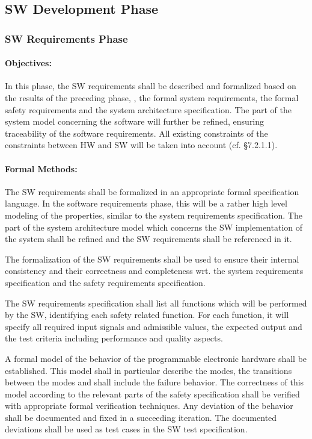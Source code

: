 \subsection{SW Development Phase}
\label{sec:sw-development-phase}

\subsubsection{SW Requirements Phase}
\label{sec:sw-requ-phase}

\paragraph{Objectives:}
\label{sec:sw-req-objective}
In this phase, the SW requirements shall be described and formalized based on
the results of the preceding phase, \ie, the formal system requirements, the
formal safety requirements and the system architecture specification. The part
of the system model concerning the software will further be refined, ensuring
traceability of the software requirements. All existing constraints of the
constraints between HW and SW will be taken into account (cf. §7.2.1.1).

\paragraph{Formal Methods:}
\label{sec:sw-req-formal-methods}
The SW requirements shall be formalized in an appropriate formal specification
language. In the software requirements phase, this will be a rather high level
modeling of the properties, similar to the system requirements
specification. The part of the system architecture model which concerns the SW
implementation of the system shall be refined and the SW requirements shall be
referenced in it.

The formalization of the SW requirements shall be used to ensure their internal
consistency and their correctness and completeness wrt. the system requirements
specification and the safety requirements specification.

The SW requirements specification shall list all functions which will be
performed by the SW, identifying each safety related function. For each
function, it will specify all required input signals and admissible values, the
expected output and the test criteria including performance and quality aspects.

A formal model of the behavior of the programmable electronic hardware shall be
established. This model shall in particular describe the modes, the transitions
between the modes and shall include the failure behavior. The correctness of
this model according to the relevant parts of the safety specification shall be
verified with appropriate formal verification techniques. Any deviation of the
behavior shall be documented and fixed in a succeeding iteration. The documented
deviations shall be used as test cases in the SW test specification.


